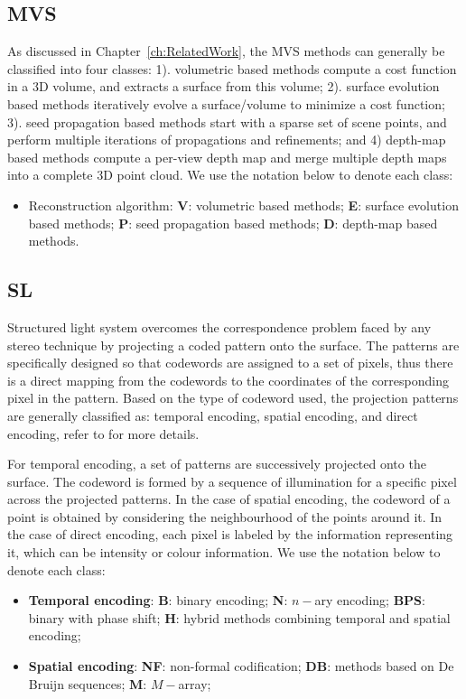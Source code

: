 \subsection{MVS}
As discussed in Chapter~\ref{ch:RelatedWork}, the MVS methods can generally be classified into four classes: 1). volumetric based methods compute a cost function in a 3D volume, and extracts a surface from this volume; 2). surface evolution based methods iteratively evolve a surface/volume to minimize a cost function; 3). seed propagation based methods start with a sparse set of scene points, and perform multiple iterations of propagations and refinements; and 4) depth-map based methods compute a per-view depth map and merge multiple depth maps into a complete 3D point cloud. We use the notation below to denote each class:
\begin{itemize}
\item Reconstruction algorithm: \textbf{V}: volumetric based methods; \textbf{E}: surface evolution based methods; \textbf{P}: seed propagation based methods; \textbf{D}: depth-map based methods.
\end{itemize}

\subsection{SL}
Structured light system overcomes the correspondence problem faced by any stereo technique by projecting a coded pattern onto the surface. The patterns are specifically designed so that codewords are assigned to a set of pixels, thus there is a direct mapping from the codewords to the coordinates of the corresponding pixel in the pattern. Based on the type of codeword used, the projection patterns are generally classified as: temporal encoding, spatial encoding, and direct encoding, refer to \cite{salvi2004pattern} for more details.

For temporal encoding, a set of patterns are successively projected onto the surface. The codeword is formed by a sequence of illumination for a specific pixel across the projected patterns. In the case of spatial encoding, the codeword of a point is obtained by considering the neighbourhood of the points around it. In the case of direct encoding, each pixel is labeled by the information representing it, which can be intensity or colour information. We use the notation below to denote each class:
\begin{itemize}
\item \textbf{Temporal encoding}: \textbf{B}: binary encoding; \textbf{N}: $n-$ary encoding; \textbf{BPS}: binary with phase shift; \textbf{H}: hybrid methods combining temporal and spatial encoding;
\item \textbf{Spatial encoding}: \textbf{NF}: non-formal codification; \textbf{DB}: methods based on  De Bruijn sequences; \textbf{M}: $M-$array;
\end{itemize}

